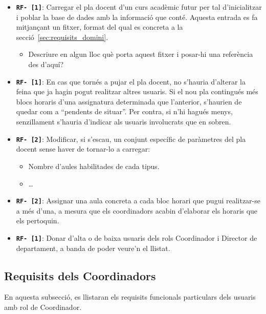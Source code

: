 \documentclass[a4paper,12pt]{ThesisStyle}
\begin{document}
\begin{itemize}
  \item \texttt{\textbf{RF- [1]}}: Carregar el pla docent d'un curs acadèmic futur per tal d'inicialitzar i poblar la base de dades amb la informació que conté. Aquesta entrada es fa mitjançant un fitxer, format del qual es concreta a la secció~\ref{sec:requisits_domini}.
    \begin{itemize}
      \item Descriure en algun lloc què porta aquest fitxer i posar-hi una referència des d'aquí?
    \end{itemize}
  \item \texttt{\textbf{RF- [1]}}: En cas que tornés a pujar el pla docent, no s'hauria d'alterar la feina que ja hagin pogut realitzar altres usuaris. Si el nou pla contingués més blocs horaris d'una assignatura determinada que l'anterior, s'haurien de quedar com a ``pendents de situar''. Per contra, si n'hi hagués menys, senzillament s'hauria d'indicar als usuaris involucrats que en sobren.
  \item \texttt{\textbf{RF- [2]}}: Modificar, si s'escau, un conjunt específic de paràmetres del pla docent sense haver de tornar-lo a carregar:
    \begin{itemize}
      \item Nombre d'aules habilitades de cada tipus.
      \item \ldots
    \end{itemize}
  \item \texttt{\textbf{RF- [2]}}: Assignar una aula concreta a cada bloc horari que pugui realitzar-se a més d'una, a mesura que els coordinadors acabin d'elaborar els horaris que els pertoquin.
  \item \texttt{\textbf{RF- [1]}}: Donar d'alta o de baixa usuaris dels rols Coordinador i Director de departament, a banda de poder veure'n el llistat.
\end{itemize}

\subsection{Requisits dels Coordinadors}
\label{subsec:requisits_coordinadors}

En aquesta subsecció, es llistaran els requisits funcionals particulars dels usuaris amb rol de Coordinador.
\end{document}

